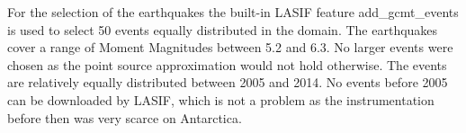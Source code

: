 For the selection of the earthquakes the built-in LASIF feature 
add\_gcmt\_events is used to select 50 events equally distributed in the
domain. The earthquakes cover a range of Moment Magnitudes between 5.2 and 6.3. 
No larger events were chosen as the point source approximation would not hold otherwise. 
The events are relatively equally distributed between 2005 and 2014. No events before 2005 can 
be downloaded by LASIF, which is not a problem as the instrumentation before then was very scarce on Antarctica. 

